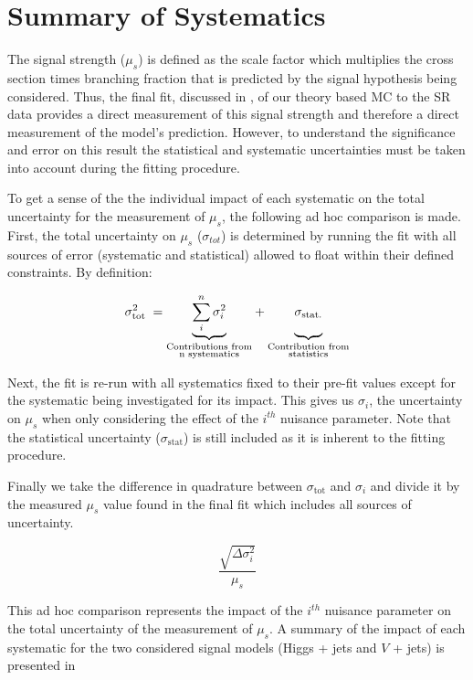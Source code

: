 \section{Summary of Systematics} \label{sec:systematics:summary}

The signal strength ($\mu_{s}$) is defined as the scale factor which multiplies
the cross section times branching fraction that is predicted by the signal
hypothesis being considered.  Thus, the final fit, discussed in
, of our theory based MC to the SR data provides a direct
measurement of this signal strength and therefore a direct measurement of the
model's prediction. However, to understand the significance and error on this
result the statistical and systematic uncertainties must be taken into account
during the fitting procedure.

To get a sense of the the individual impact of each systematic on the total
uncertainty for the measurement of $\mu_{s}$, the following ad hoc comparison
is made.  First, the total uncertainty on $\mu_{s}$ ($\sigma_{tot}$) is
determined by running the fit with all sources of error (systematic and
statistical) allowed to float within their defined constraints.  By definition:

$$ \sigma_{\text{tot}}^{2} \; = {\underbrace{\sum_{i}^{n} \sigma_{i}^{2}}_{\substack{\text{Contributions from} \\ \text{n systematics}}}} + {\underbrace{\vphantom{\sum_{i}^{n}} \sigma_{\text{stat.}}}_{\substack{\text{Contribution from} \\ \text{statistics}}}}$$

Next, the fit is re-run with all systematics fixed to their pre-fit values
except for the systematic being investigated for its impact. This gives us
$\sigma_{i}$, the uncertainty on $\mu_{s}$ when only considering the effect of
the $i^{th}$ nuisance parameter. Note that the statistical uncertainty
($\sigma_{\text{stat}}$) is still included as it is inherent to the fitting
procedure.

Finally we take the difference in quadrature between $\sigma_{\text{tot}}$ and
$\sigma_{i}$ and divide it by the measured $\mu_{s}$ value found in the final
fit which includes all sources of uncertainty. 

$$ \frac{\sqrt{\Delta \sigma_i^2}}{\mu_{s}} $$

This ad hoc comparison represents the impact of the $i^{th}$ nuisance parameter
on the total uncertainty of the measurement of $\mu_{s}$. A summary of the
impact of each systematic for the two considered signal models (Higgs + jets
and $V$ + jets) is presented in 


